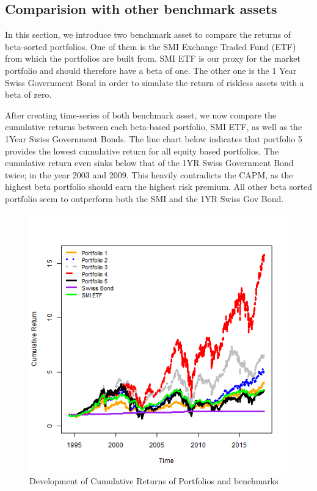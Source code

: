 \documentclass[12pt,a4paper]{article}
\begin{document}
\begin{justify}
\subsection{Comparision with other benchmark assets}
In this section, we introduce two benchmark asset to compare the returns of beta-sorted portfolios. One of them is the SMI Exchange Traded Fund (ETF) from which the portfolios are built from. SMI ETF is our proxy for the market portfolio and should therefore have a beta of one. The other one is the 1 Year Swiss Government Bond in order to simulate the return of riskless assets with a beta of zero. 

After creating time-series of both benchmark asset, we now compare the cumulative returns between each beta-based portfolio, SMI ETF, as well as the 1Year Swiss Government Bonds. The line chart below indicates that portfolio 5 provides the lowest cumulative return for all equity based portfolios. The cumulative return even sinks below that of the 1YR Swiss Government Bond twice; in the year 2003 and 2009. This heavily contradicts the CAPM, as the highest beta portfolio should earn the highest risk premium. All other beta sorted portfolio seem to outperform both the SMI and the 1YR Swiss Gov Bond.    
\begin{figure}[H]
\centering
\includegraphics[width=1\textwidth,height=0.8\textwidth]{Cumulative Returns with SMI&SGB.png}
\caption{Development of Cumulative Returns of Portfolios and benchmarks}
\label{fig:Development of Cumulative Returns of Portfolios and benchmarks}
\end{figure}



\end{justify}
\end{document}
